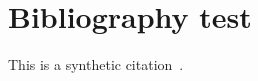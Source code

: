 \documentclass{article}
\begin{document}
\section{Bibliography test}
\label{sec:references}
This is a synthetic citation~\cite{loom2026}.
\printbibliography
\end{document}
